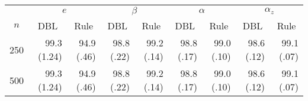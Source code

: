 \begin{tabular}{lrrrrrrrr}
   \hline
 
       &  \multicolumn{2}{c}{$e$}    & \multicolumn{2}{c}{$\beta$}  & \multicolumn{2}{c}{$\alpha$}  & \multicolumn{2}{c}{$\alpha_z$} \\ 
          \cmidrule(l{2pt}r{2pt}){2-3} \cmidrule(l{2pt}r{2pt}){4-5} \cmidrule(l{2pt}r{2pt}){6-7} \cmidrule(l{2pt}r{2pt}){8-9} 
         \multicolumn{1}{c}{$n$} & \multicolumn{1}{c}{DBL}& \multicolumn{1}{c}{Rule}& \multicolumn{1}{c}{DBL}& \multicolumn{1}{c}{Rule}& \multicolumn{1}{c}{DBL}& \multicolumn{1}{c}{Rule}& \multicolumn{1}{c}{DBL}& \multicolumn{1}{c}{Rule} \\ \hline
    250 & 99.3 (1.24) & 94.9 (.46) & 98.8 (.22) & 99.2 (.14) & 98.8 (.17) & 99.0 (.10) & 98.6 (.12) & 99.1 (.07) \\ 
  500 & 99.3 (1.24) & 94.9 (.46) & 98.8 (.22) & 99.2 (.14) & 98.8 (.17) & 99.0 (.10) & 98.6 (.12) & 99.1 (.07) \\ 
   \hline
\end{tabular}
